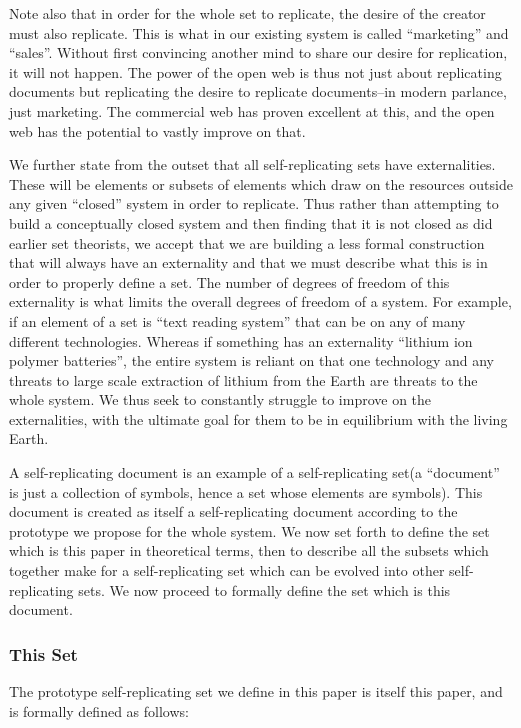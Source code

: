 Note also that in order for the whole set to replicate, the desire of
the creator must also replicate. This is what in our existing system is
called ``marketing'' and ``sales''. Without first convincing another
mind to share our desire for replication, it will not happen. The power
of the open web is thus not just about replicating documents but
replicating the desire to replicate documents--in modern parlance, just
marketing. The commercial web has proven excellent at this, and the open
web has the potential to vastly improve on that.

We further state from the outset that all self-replicating sets have
externalities. These will be elements or subsets of elements which draw
on the resources outside any given ``closed'' system in order to
replicate. Thus rather than attempting to build a conceptually closed
system and then finding that it is not closed as did earlier set
theorists, we accept that we are building a less formal construction
that will always have an externality and that we must describe what this
is in order to properly define a set. The number of degrees of freedom
of this externality is what limits the overall degrees of freedom of a
system. For example, if an element of a set is ``text reading system''
that can be on any of many different technologies. Whereas if something
has an externality ``lithium ion polymer batteries'', the entire system
is reliant on that one technology and any threats to large scale
extraction of lithium from the Earth are threats to the whole system. We
thus seek to constantly struggle to improve on the externalities, with
the ultimate goal for them to be in equilibrium with the living Earth.

A self-replicating document is an example of a self-replicating set(a
``document'' is just a collection of symbols, hence a set whose elements
are symbols). This document is created as itself a self-replicating
document according to the prototype we propose for the whole system. We
now set forth to define the set which is this paper in theoretical
terms, then to describe all the subsets which together make for a
self-replicating set which can be evolved into other self-replicating
sets. We now proceed to formally define the set which is this document.

\subsubsection{This Set}\label{this-set}

The prototype self-replicating set we define in this paper is itself
this paper, and is formally defined as follows:

